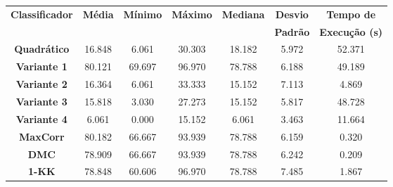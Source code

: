 \begin{tabular}{|c|c|c|c|c|c|c|}%
\hline%
\multirow{2}{*}{\textbf{Classificador}}&\multirow{2}{*}{\textbf{Média}}&\multirow{2}{*}{\textbf{Mínimo}}&\multirow{2}{*}{\textbf{Máximo}}&\multirow{2}{*}{\textbf{Mediana}}&\textbf{Desvio}&\textbf{Tempo de}\\%
&&&&&\textbf{Padrão}&\textbf{Execução (s)}\\%
\hline%
\hline%
\textbf{Quadrático}&16.848&6.061&30.303&18.182&5.972&52.371\\%
\hline%
\textbf{Variante 1}&80.121&69.697&96.970&78.788&6.188&49.189\\%
\hline%
\textbf{Variante 2}&16.364&6.061&33.333&15.152&7.113&4.869\\%
\hline%
\textbf{Variante 3}&15.818&3.030&27.273&15.152&5.817&48.728\\%
\hline%
\textbf{Variante 4}&6.061&0.000&15.152&6.061&3.463&11.664\\%
\hline%
\textbf{MaxCorr}&80.182&66.667&93.939&78.788&6.159&0.320\\%
\hline%
\textbf{DMC}&78.909&66.667&93.939&78.788&6.242&0.209\\%
\hline%
\textbf{1{-}KK}&78.848&60.606&96.970&78.788&7.485&1.867\\%
\hline%
\hline%
\end{tabular}
